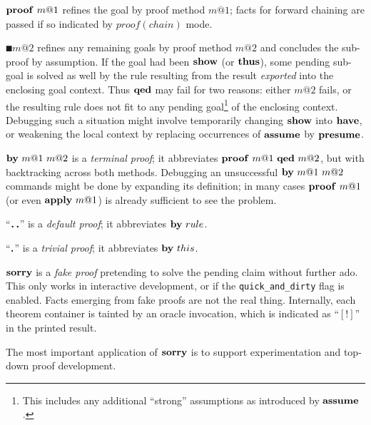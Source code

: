 \begin{descr}
  
\item [$\PROOF{m@1}$] refines the goal by proof method $m@1$; facts for
  forward chaining are passed if so indicated by $proof(chain)$ mode.
  
\item [$\QED{m@2}$] refines any remaining goals by proof method $m@2$ and
  concludes the sub-proof by assumption.  If the goal had been ${\mathord{\mathbf{show}}}$ (or
  ${\mathord{\mathbf{thus}}}$), some pending sub-goal is solved as well by the rule resulting
  from the result \emph{exported} into the enclosing goal context.  Thus
  ${\mathord{\mathbf{qed}}}$ may fail for two reasons: either $m@2$ fails, or the resulting
  rule does not fit to any pending goal\footnote{This includes any additional
    ``strong'' assumptions as introduced by ${\mathord{\mathbf{assume}}}$.} of the enclosing
  context.  Debugging such a situation might involve temporarily changing
  ${\mathord{\mathbf{show}}}$ into ${\mathord{\mathbf{have}}}$, or weakening the local context by replacing
  occurrences of ${\mathord{\mathbf{assume}}}$ by ${\mathord{\mathbf{presume}}}$.
  
\item [$\BYY{m@1}{m@2}$] is a \emph{terminal proof}; it
  abbreviates $\PROOF{m@1}~\QED{m@2}$, but with backtracking across both
  methods.  Debugging an unsuccessful $\BYY{m@1}{m@2}$ commands might be done
  by expanding its definition; in many cases $\PROOF{m@1}$ (or even
  $\APPLY{m@1}$) is already sufficient to see the problem.

\item [``$\textbf{.\,.}$''] is a \emph{default proof}; it
  abbreviates $\BY{rule}$.

\item [``$\textbf{.}$''] is a \emph{trivial proof}; it
  abbreviates $\BY{this}$.
  
\item [${\mathord{\mathbf{sorry}}}$] is a \emph{fake proof} pretending to solve
  the pending claim without further ado.  This only works in interactive
  development, or if the \texttt{quick_and_dirty} flag is enabled.  Facts
  emerging from fake proofs are not the real thing.  Internally, each theorem
  container is tainted by an oracle invocation, which is indicated as
  ``$[!]$'' in the printed result.
  
  The most important application of ${\mathord{\mathbf{sorry}}}$ is to support experimentation and
  top-down proof development.
\end{descr}


